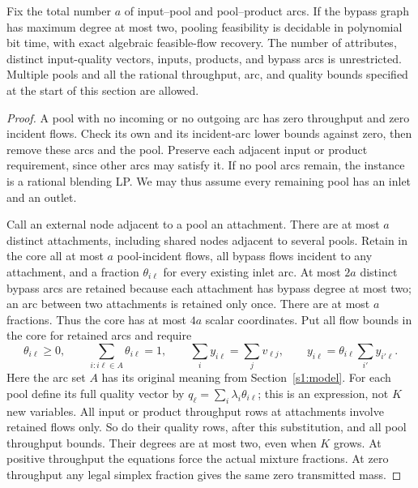 \begin{theorem}
\label{s4:bounded-attachments}
Fix the total number $a$ of input--pool and pool--product arcs.
If the bypass graph has maximum degree at most two, pooling feasibility
is decidable in polynomial bit time, with exact algebraic feasible-flow
recovery. The number of attributes, distinct input-quality vectors,
inputs, products, and bypass arcs is unrestricted. Multiple pools and
all the rational throughput, arc, and quality bounds specified at the
start of this section are allowed.
\end{theorem}
\begin{proof}
A pool with no incoming or no outgoing arc has zero throughput and
zero incident flows. Check its own and its incident-arc lower bounds
against zero, then remove these arcs and the pool. Preserve each
adjacent input or product requirement, since other arcs may satisfy
it. If no pool arcs remain, the instance is a rational blending LP.
We may thus assume every remaining pool has an inlet and an outlet.

Call an external node adjacent to a pool an attachment. There are
at most $a$ distinct attachments, including shared nodes adjacent to
several pools. Retain in the core all at most $a$ pool-incident flows,
all bypass flows incident to any attachment, and a fraction
$\theta_{i\ell}$ for every existing inlet arc. At most $2a$ distinct
bypass arcs are retained because each attachment has bypass degree
at most two; an arc between two attachments is retained only once.
There are at most $a$ fractions. Thus the core has at most $4a$
scalar coordinates. Put all flow bounds in the core for retained
arcs and require
\begin{equation}
 \theta_{i\ell}\ge0,\qquad
 \sum_{i:i\ell\in A}\theta_{i\ell}=1,\qquad
 \sum_i y_{i\ell}=\sum_jv_{\ell j},\qquad
 y_{i\ell}=\theta_{i\ell}\sum_{i'}y_{i'\ell}.
 \label{s4:attachment-fractions}
\end{equation}
Here the arc set $A$ has its original meaning from Section~\ref{s1:model}.
For each pool define its full quality vector by
$q_\ell=\sum_i\lambda_i\theta_{i\ell}$; this is an expression, not
$K$ new variables. All input or product throughput rows at attachments
involve retained flows only. So do their quality rows, after this
substitution, and all pool throughput bounds. Their degrees are at
most two, even when $K$ grows. At positive throughput the equations
force the actual mixture fractions. At zero throughput any legal
simplex fraction gives the same zero transmitted mass.


\end{proof}
